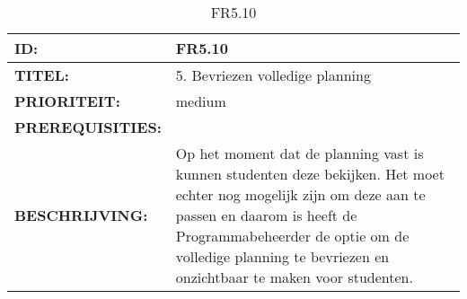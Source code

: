 \noindent\begin{table}[h]
            \begin{tabular}{l | p{10cm}}
                \textbf{ID:} & FR5.10 \\ \hline
                \textbf{TITEL:} & 5. Bevriezen volledige planning\\ \hline
                \textbf{PRIORITEIT:} &  medium \\ \hline
                \textbf{PREREQUISITIES:} & \\ \hline
                \textbf{BESCHRIJVING:} & Op het moment dat de planning vast is kunnen studenten deze bekijken. Het moet echter nog mogelijk zijn om deze aan te passen en daarom is heeft de Programmabeheerder de optie om de volledige planning te bevriezen en onzichtbaar te maken voor studenten.\\ 
            \end{tabular}\\
            \caption{FR5.10}
            \label{tab:myfifteenthtable}
        \end{table}


\clearpage